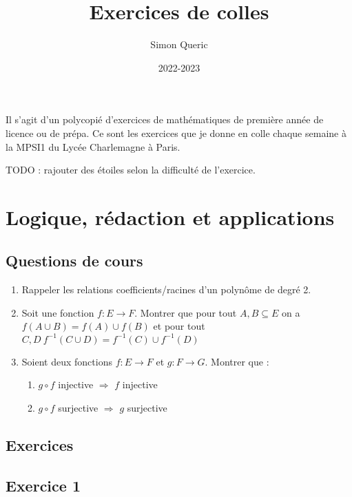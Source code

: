 \documentclass{article}
\title{Exercices de colles}
\date{2022-2023}
\author{Simon Queric}
\begin{document}
\maketitle

Il s'agit d'un polycopié d'exercices de mathématiques de première année de licence ou de prépa. Ce sont les exercices que je donne en colle chaque semaine à la MPSI1 du Lycée Charlemagne à Paris. 

TODO : rajouter des étoiles selon la difficulté de l'exercice. 

\clearpage
\tableofcontents
\clearpage


\large 
\section{Logique, rédaction et applications}

\subsection*{Questions de cours}
\setlength{\parindent}{0cm}

\begin{enumerate}
    \item Rappeler les relations coefficients/racines d'un polynôme de degré 2. 
    \item Soit une fonction $f:E\to F$. Montrer que pour tout $A, B \subseteq E$ on a $f(A\cup B) = f(A)\cup f(B)$ et pour tout $C, D \ f^{-1}(C\cup D) = f^{-1}(C)\cup f^{-1}(D)$ 
    \item Soient deux fonctions $f:E \to F$ et $g:F\to G$. Montrer que : 
   \begin{enumerate}
       \item $g\circ f$ injective $\Rightarrow$ $f$ injective 
       \item $g\circ f$ surjective $\Rightarrow$ $g$ surjective 
   \end{enumerate} 

\end{enumerate}


\subsection*{Exercices}
\setlength{\parindent}{0cm}

\subsection*{Exercice 1} 
\end{document}
